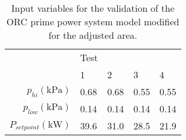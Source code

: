 \begin{table}[h]
	\centering
	\caption{Input variables for the validation of the ORC prime power system model modified for the adjusted area.}
	\label{tab:verification_ORC_vars02}
	\begin{tabular}{rllll}
		\toprule
		                                              &  Test &       &       &       \\ \cline{2-5}
		                                              &     1 &     2 &     3 &     4 \\ \midrule

		$p_{hi}(\si{\kilo\pascal})  $                 &  0.68 &  0.68 &  0.55 &  0.55 \\
		$p_{low}(\si{\kilo\pascal}) $                 &  0.14 &  0.14 &  0.14 &  0.14 \\
		$P_{setpoint}(\si{\kilo\watt})$               &  39.6 &  31.0 &  28.5 &  21.9 \\ 
		\bottomrule
	\end{tabular}
\end{table}


